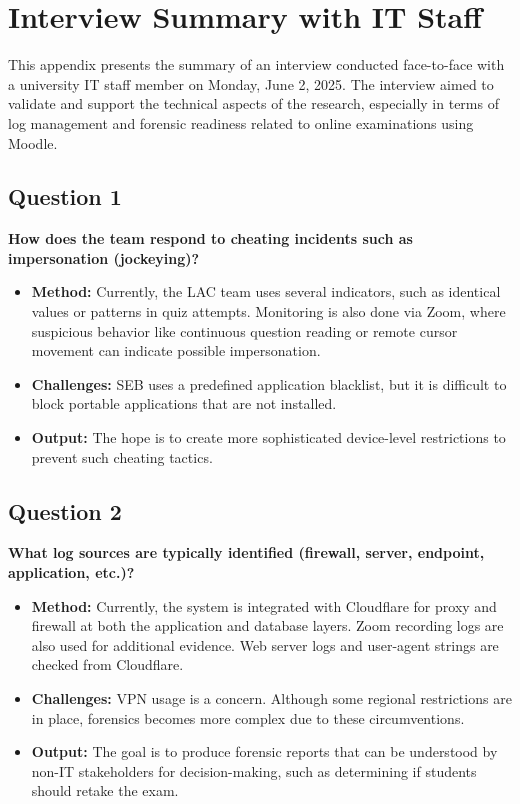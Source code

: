 \chapter{Interview Summary with IT Staff}\label{app:appendix_interview}

This appendix presents the summary of an interview conducted face-to-face with a university IT staff member on Monday, June 2, 2025. The interview aimed to validate and support the technical aspects of the research, especially in terms of log management and forensic readiness related to online examinations using Moodle.

\section*{Question 1}
\textbf{How does the team respond to cheating incidents such as impersonation (jockeying)?}

\begin{itemize}
	\item \textbf{Method:} Currently, the LAC team uses several indicators, such as identical values or patterns in quiz attempts. Monitoring is also done via Zoom, where suspicious behavior like continuous question reading or remote cursor movement can indicate possible impersonation.
	\item \textbf{Challenges:} SEB uses a predefined application blacklist, but it is difficult to block portable applications that are not installed. 
	\item \textbf{Output:} The hope is to create more sophisticated device-level restrictions to prevent such cheating tactics.
\end{itemize}

\section*{Question 2}
\textbf{What log sources are typically identified (firewall, server, endpoint, application, etc.)?}

\begin{itemize}
	\item \textbf{Method:} Currently, the system is integrated with Cloudflare for proxy and firewall at both the application and database layers. Zoom recording logs are also used for additional evidence. Web server logs and user-agent strings are checked from Cloudflare.
	\item \textbf{Challenges:} VPN usage is a concern. Although some regional restrictions are in place, forensics becomes more complex due to these circumventions.
	\item \textbf{Output:} The goal is to produce forensic reports that can be understood by non-IT stakeholders for decision-making, such as determining if students should retake the exam.
\end{itemize}

